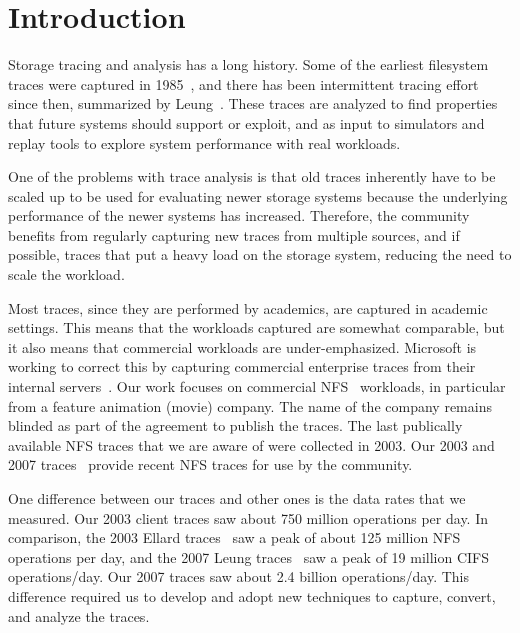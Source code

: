 \section{Introduction}

Storage tracing and analysis has a long history.  Some of the earliest
filesystem traces were captured in 1985~\cite{ousterhout85}, and there
has been intermittent tracing effort since then, summarized by
Leung~\cite{LeungUsenix08}.  These traces are
analyzed to find properties that future systems should support or
exploit, and as input to simulators and replay tools to explore system
performance with real workloads.

One of the problems
with trace analysis is that old traces inherently have to be scaled up
to be used for evaluating newer storage systems because the
underlying performance of the newer systems has increased.  Therefore,
the community benefits from regularly capturing new traces from multiple
sources, and if possible, traces that put a heavy load on the storage
system, reducing the need to scale the workload.

Most traces, since they are performed by academics, are captured in
academic settings.  This means that the workloads captured are
somewhat comparable, but it also means that commercial workloads are
under-emphasized.  Microsoft is working to correct this by capturing
commercial enterprise traces from their internal
servers~\cite{snia-iotta-microsoft}.  Our work focuses on commercial
NFS~\cite{rfc1094nfs} workloads, in particular from a feature animation (movie) company.
The name of the company remains blinded as part of the agreement to
publish the traces.  The last publically available NFS traces that we
are aware of were collected in 2003.  Our 2003 and 2007
traces~\cite{animation-bear-traces} provide recent NFS traces for use
by the community.

One difference between our traces and other ones is the data rates
that we measured.  Our 2003 client traces saw about 750 million
operations per day.  In comparison, the 2003 Ellard
traces~\cite{EllardLisa03} saw a peak of about 125 million NFS
operations per day, and the 2007 Leung traces~\cite{LeungUsenix08}
saw a peak of 19 million CIFS operations/day.  Our 2007 traces saw
about 2.4 billion operations/day.  This difference required us to
develop and adopt new techniques to capture, convert, and analyze the
traces.

